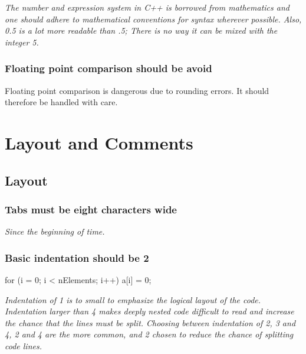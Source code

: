 \documentclass[a4paper,11pt,oneside]{scrbook}
\newcommand{\guideline}[1]{{\subsection{#1}}}
\newcommand{\motivation}[1]{{\normalfont \itshape #1}}
\begin{document}
\motivation{
  The number and expression system in C++ is borrowed from mathematics
  and one should adhere to mathematical conventions for syntax wherever
  possible. Also, 0.5 is a lot more readable than .5; There is no way it
  can be mixed with the integer 5.
}

\guideline{Floating point comparison should be avoid}

Floating point comparison is dangerous due to rounding errors. It should therefore
be handled with care.

\chapter{Layout and Comments}

\section{Layout}

\guideline{Tabs must be eight characters wide}

\motivation{
  Since the beginning of time.
}

\guideline{Basic indentation should be 2}

\begin{code}
  for (i = 0; i < nElements; i++) {
    a[i] = 0; 
  }
\end{code}

\motivation{ 
  Indentation of 1 is to small to emphasize the logical
  layout of the code. Indentation larger than 4 makes deeply nested
  code difficult to read and increase the chance that the lines must
  be split. Choosing between indentation of 2, 3 and 4, 2 and 4 are
  the more common, and 2 chosen to reduce the chance of splitting code
  lines.
}
\end{document}
